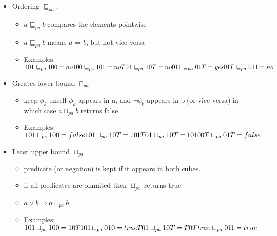 \begin{itemize}
    \item Ordering $\sqsubseteq_{pa}$: 
        \begin{itemize}
            \item $a \sqsubseteq_{pa} b$ compares the elements pointwise
            \item $a \sqsubseteq_{pa} b $ means $a \Rightarrow b$, but not vice versa
            \item Examples:\\
                $101 \sqsubseteq_{pa} 100 = no\\ 100 \sqsubseteq_{pa} 101 = no\\T01 \sqsubseteq_{pa} 10T = no\\011 \sqsubseteq_{pa} 01T = yes\\01T \sqsubseteq_{pa} 011 = no$
        \end{itemize}
    \item Greates lower bound $\sqcap_{pa}$
        \begin{itemize}
            \item keep $\phi_k$ unsell $\phi_k$ appears in a, and $\neg \phi_k$ appears in b (or vice versa) in which case $a \sqcap_{pa} b$ returns false
            \item Examples: $101 \sqcap_{pa} 100 = false\\101 \sqcap_{pa} 10T = 101\\ T01 \sqcap_{pa} 10T = 101\\ 00T \sqcap_{pa} 01T = false$
        \end{itemize}
    \item Least upper bound $\sqcup_{pa}$
        \begin{itemize}
            \item predicate (or negation) is kept if it appears in both cubes. 
            \item if all predicates are ommited then $\sqcup_{pa}$ returns true
            \item $a \vee b \Rightarrow a \sqcup_{pa} b$
            \item Examples:\\ $101 \sqcup_{pa} 100 = 10T\\101 \sqcup_{pa} 010 = true\\T01 \sqcup_{pa} 10T = T0T\\true \sqcup_{pa} 011 = true$
        \end{itemize}
\end{itemize}
